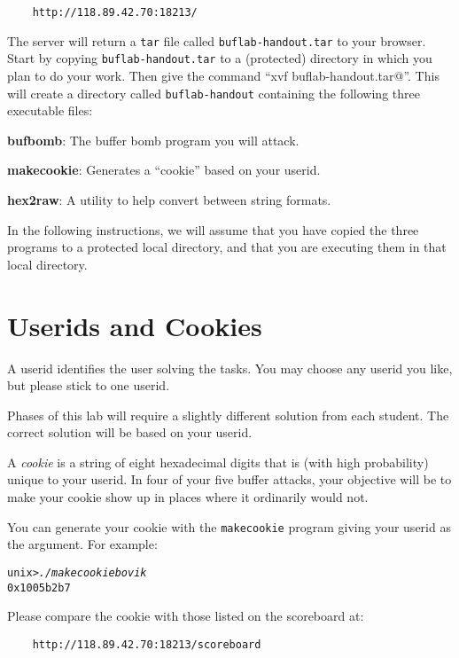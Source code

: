 \documentclass[11pt]{article}
\newenvironment{tty}%
{\small\begin{alltt}}%
{\end{alltt}}
\begin{document}
\begin{verbatim}
    http://118.89.42.70:18213/
\end{verbatim}

The server will return a \texttt{tar} file called
\texttt{buflab-handout.tar} to your browser.  Start by copying
\texttt{buflab-handout.tar} to a (protected) directory in which you
plan to do your work.  Then give the command
``\verb@tar xvf buflab-handout.tar@''.  This will create a directory
called \texttt{buflab-handout} containing the following three
executable files:
\begin{description}
\item {\bf bufbomb}: The buffer bomb program you will attack.
\item {\bf makecookie}: Generates a ``cookie'' based on your userid.
\item {\bf hex2raw}: A utility to help convert between string formats.
\end{description}

In the following instructions, we will assume that you have copied the
three programs to a protected local directory, and that you are
executing them in that local directory.


\section*{Userids and Cookies}

A userid identifies the user solving the tasks. You may choose any userid 
you like, but please stick to one userid.

Phases of this lab will require a slightly different solution from
each student. The correct solution will be based on your userid.

A {\em cookie} is a string of eight hexadecimal digits that is (with
high probability) unique to your userid. In four of your five buffer attacks,
 your objective will be to make your cookie show up in places where 
it ordinarily would not. 

You can generate your cookie with the {\tt makecookie} program giving your userid as the
argument.  For example:
\begin{tty}
unix>{\em ./makecookie bovik}
0x1005b2b7
\end{tty}

Please compare the cookie with those listed on the scoreboard at:

\begin{verbatim}
    http://118.89.42.70:18213/scoreboard
\end{verbatim}
\end{document}
